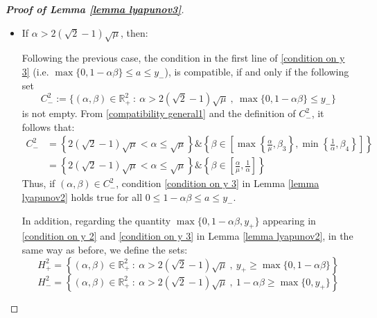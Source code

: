 \documentclass[reqno]{amsart}
\theoremstyle{plain}
\theoremstyle{definition}
\theoremstyle{remark}
\newcommand{\R}{\mathbb{R}}	%
\begin{document}
\begin{proof}[\textbf{Proof of Lemma \ref{lemma lyapunov3}}]
\begin{itemize}[wide=0pt]
\begin{itemize}[wide=5pt]
\begin{flalign}
\begin{cases}
					\end{cases}
					\notag\\
					&= 
					\left\{\alpha \leq {} \right\}\& \left\{\beta\in {}\cup{}\right\} 
			\end{flalign}
			which shows that  if $(\alpha,\beta)\in H_{-}^{1}$, then condition \eqref{condition on y 2} in Lemma \ref{lemma lyapunov2} holds true for all $0\leq 1-\alpha\beta\leq a\leq 1+\alpha\beta$.
		\end{itemize}
		
		\item If $\alpha>2(\sqrt{2}-1)\sqrt{\mu}$, then:
		
		Following the previous case,  the condition in the first line of \eqref{condition on y 3} (i.e. $\max\{0,1-\alpha\beta\} \leq a \leq y_{-}$), is compatible, if and only if the following set 
		\begin{equation}
			C^{2}_{-} := \{(\alpha,\beta)\in \R_{+}^{2}~:~\alpha> 2(\sqrt{2}-1)\sqrt\mu ~,~ \max\{0,1-\alpha\beta\} \leq y_{-} \}		
		\end{equation} is not empty.
		From \eqref{compatibility general1} and the definition of $C^{2}_{-}$, it follows that:
		\begin{equation}\label{compatibility case 2}
			\begin{aligned}
				C^{2}_{-}&=\left\{2(\sqrt{2}-1)\sqrt{\mu}<\alpha\leq \sqrt{\mu}\right\} \& \left\{\beta\in\left[\max\left\{\frac{\alpha}{\mu},\beta_{3}\right\},\min\left\{\frac{1}{\alpha},\beta_{4}\right\}\right]\right\} \\ &=  \left\{2(\sqrt{2}-1)\sqrt{\mu}<\alpha\leq \sqrt{\mu}\right\} \& \left\{\beta\in \left[ \frac{\alpha}{\mu}, \frac{1}{\alpha} \right]\right\}
			\end{aligned}
		\end{equation}
		Thus, if $(\alpha,\beta) \in C_{-}^{2}$, condition \eqref{condition on y 3} in Lemma \ref{lemma lyapunov2} holds true for all $0\leq 1-\alpha\beta \leq a \leq y_{-}$.
		
		In addition, regarding the quantity $\max\{0,1-\alpha\beta,y_{+}\}$ appearing in \eqref{condition on y 2} and \eqref{condition on y 3} in Lemma \ref{lemma lyapunov2}, in the same way as before, we define the sets:
		\begin{equation}\label{H2plus}
			H_{+}^{2} =  \left\{(\alpha,\beta)\in \R_{+}^{2}~:~ \alpha> 2(\sqrt{2}-1)\sqrt{\mu} ~,~ y_{+}\geq \max\{0,1-\alpha\beta\}\right\}
		\end{equation}
		\begin{equation}\label{H2min}
			H_{-}^{2} =   \left\{(\alpha,\beta)\in \R_{+}^{2}~:~ \alpha> 2(\sqrt{2}-1)\sqrt{\mu} ~,~ 1-\alpha\beta\geq \max\{0,y_{+}\}\right\}
		\end{equation}
		

\end{itemize}
\end{proof}
\end{document}
